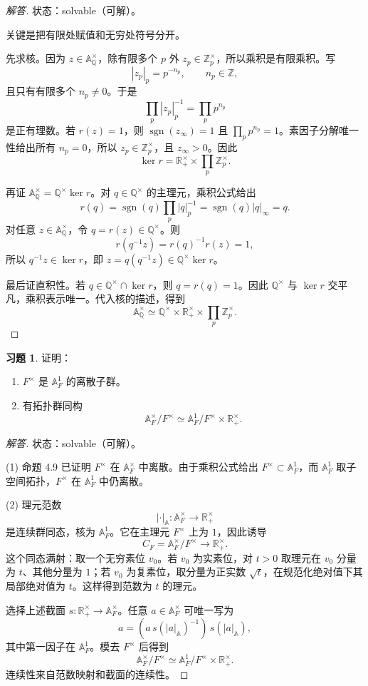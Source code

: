 \documentclass[11pt,a4paper,openany]{ctexbook}
\numberwithin{equation}{chapter}
\newcommand{\Q}{\mathbb{Q}}
\newcommand{\R}{\mathbb{R}}
\newcommand{\Z}{\mathbb{Z}}
\newcommand{\A}{\mathbb{A}}
\theoremstyle{plain}
\theoremstyle{definition}
\newtheorem{exercise}[theorem]{习题}
\theoremstyle{remark}
\begin{document}
\begin{proof}[解答]
状态：solvable（可解）。

关键是把有限处赋值和无穷处符号分开。

先求核。因为 $z\in\A_\Q^\times$，除有限多个 $p$ 外 $z_p\in\Z_p^\times$，所以乘积是有限乘积。写
\[
 |z_p|_p=p^{-n_p},\qquad n_p\in\Z,
\]
且只有有限多个 $n_p\ne0$。于是
\[
 \prod_p|z_p|_p^{-1}=\prod_pp^{n_p}
\]
是正有理数。若 $r(z)=1$，则 $\operatorname{sgn}(z_\infty)=1$ 且 $\prod_pp^{n_p}=1$。素因子分解唯一性给出所有 $n_p=0$，所以 $z_p\in\Z_p^\times$，且 $z_\infty>0$。因此
\[
 \ker r=\R_+^\times\times\prod_p\Z_p^\times.
\]

再证 $\A_\Q^\times=\Q^\times\ker r$。对 $q\in\Q^\times$ 的主理元，乘积公式给出
\[
 r(q)=\operatorname{sgn}(q)\prod_p|q|_p^{-1}
 =\operatorname{sgn}(q)|q|_\infty=q.
\]
对任意 $z\in\A_\Q^\times$，令 $q=r(z)\in\Q^\times$。则
\[
 r(q^{-1}z)=r(q)^{-1}r(z)=1,
\]
所以 $q^{-1}z\in\ker r$，即 $z=q(q^{-1}z)\in\Q^\times\ker r$。

最后证直积性。若 $q\in\Q^\times\cap\ker r$，则 $q=r(q)=1$。因此 $\Q^\times$ 与 $\ker r$ 交平凡，乘积表示唯一。代入核的描述，得到
\[
 \A_\Q^\times\simeq
 \Q^\times\times\R_+^\times\times\prod_p\Z_p^\times.
\]
\end{proof}

\begin{exercise}
证明：
\begin{enumerate}[label=(\arabic*)]
\item $F^\times$ 是 $\A_F^1$ 的离散子群。
\item 有拓扑群同构
\[
 \A_F^\times/F^\times\simeq \A_F^1/F^\times\times\R_+^\times.
\]
\end{enumerate}
\end{exercise}

\begin{proof}[解答]
状态：solvable（可解）。

(1) 命题 4.9 已证明 $F^\times$ 在 $\A_F^\times$ 中离散。由于乘积公式给出 $F^\times\subset\A_F^1$，而 $\A_F^1$ 取子空间拓扑，$F^\times$ 在 $\A_F^1$ 中仍离散。

(2) 理元范数
\[
 |\cdot|_\A:\A_F^\times\to\R_+^\times
\]
是连续群同态，核为 $\A_F^1$。它在主理元 $F^\times$ 上为 $1$，因此诱导
\[
 C_F=\A_F^\times/F^\times\to\R_+^\times.
\]
这个同态满射：取一个无穷素位 $v_0$。若 $v_0$ 为实素位，对 $t>0$ 取理元在 $v_0$ 分量为 $t$、其他分量为 $1$；若 $v_0$ 为复素位，取分量为正实数 $\sqrt t$，在规范化绝对值下其局部绝对值为 $t$。这样得到范数为 $t$ 的理元。

选择上述截面 $s:\R_+^\times\to\A_F^\times$。任意 $a\in\A_F^\times$ 可唯一写为
\[
 a=(a\,s(|a|_\A)^{-1})\,s(|a|_\A),
\]
其中第一因子在 $\A_F^1$。模去 $F^\times$ 后得到
\[
 \A_F^\times/F^\times\simeq \A_F^1/F^\times\times\R_+^\times.
\]
连续性来自范数映射和截面的连续性。
\end{proof}
\end{document}
